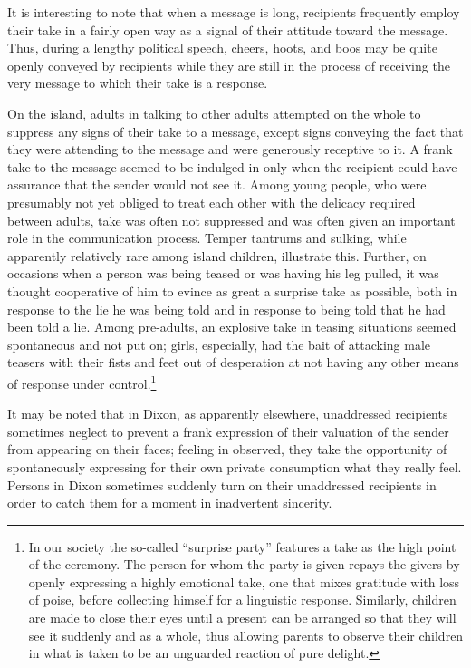 \documentclass[openany,nobib]{tufte-book}
\begin{document}
It is interesting to note that when a message is long, recipients
frequently employ their take in a fairly open way as a signal of their
attitude toward the message. Thus, during a lengthy political speech,
cheers, hoots, and boos may be quite openly conveyed by recipients while
they are still in the process of receiving the very message to which
their take is a response.

On the island, adults in talking to other adults attempted on the whole
to suppress any signs of their take to a message, except signs conveying
the fact that they were attending to the message and were generously
receptive to it. A frank take to the message seemed to be indulged in
only when the recipient could have assurance that the sender would not
see it. Among young people, who were presumably not yet obliged to treat
each other with the delicacy required between adults, take was often not
suppressed and was often given an important role in the communication
process. Temper tantrums and sulking, while apparently relatively rare
among island children, illustrate this. Further, on occasions when a
person was being teased or was having his leg pulled, it was thought
cooperative of him to evince as great a surprise take as possible, both
in response to the lie he was being told and in response to being told
that he had been told a lie. Among pre-adults, an explosive take in
teasing situations seemed spontaneous and not put on; girls, especially,
had the bait of attacking male teasers with their fists and feet out of
desperation at not having any other means of response under
control.\footnote{In our society the so-called ``surprise party''
  features a take as the high point of the ceremony. The person for whom
  the party is given repays the givers by openly expressing a highly
  emotional take, one that mixes gratitude with loss of poise, before
  collecting himself for a linguistic response. Similarly, children are
  made to close their eyes until a present can be arranged so that they
  will see it suddenly and as a whole, thus allowing parents to observe
  their children in what is taken to be an unguarded reaction of pure
  delight.}

It may be noted that in Dixon, as apparently elsewhere, unaddressed
recipients sometimes neglect to prevent a frank expression of their
valuation of the sender from appearing on their faces; feeling in
observed, they take the opportunity of spontaneously expressing for
their own private consumption what they really feel. Persons in Dixon
sometimes suddenly turn on their unaddressed recipients in order to
catch them for a moment in inadvertent sincerity.
\end{document}
